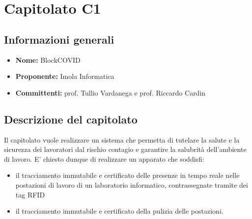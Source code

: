 \section{Capitolato C1}

\subsection{Informazioni generali}
\begin{itemize}
\item \textbf{Nome:} BlockCOVID
\item \textbf{Proponente:} Imola Informatica
\item \textbf{Committenti:} prof. Tullio Vardanega e prof. Riccardo Cardin
\end{itemize}

\subsection{Descrizione del capitolato}
Il capitolato vuole realizzare un sistema che permetta di tutelare la salute e la sicurezza dei lavoratori dal rischio contagio e garantire la salubrità dell'ambiente di lavoro. E' chiesto dunque di realizzare un apparato che soddisfi:
\begin{itemize}
\item il tracciamento immutabile e certificato delle presenze in tempo reale nelle postazioni di lavoro di un laboratorio informatico, contrassegnate tramite dei tag RFID
\item il tracciamento immutabile e certificato della pulizia delle postazioni.
\end{itemize}
